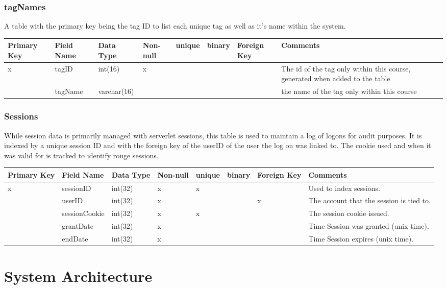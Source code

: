 \documentclass{article}
\begin{document}
\subsubsection{tagNames}
A table with the primary key being the tag ID to list each unique tag as well as it's name within the system.\\
\begin{tabular}{|m{1cm} | m{2cm} | m{1.5cm}| m{1cm} | m{1cm}| m{1cm} | m{1cm}| m{4cm}| }
  \hline
  Primary Key & Field Name & Data Type & Non-null & unique & binary & Foreign Key & Comments\\ 
  \hline
  x & tagID & int(16) & x & & & & The id of the tag only within this course, generated when added to the table\\
  \hline
   & tagName & varchar(16) & & & & & the name of the tag only within this course\\
  \hline
\end{tabular}

\subsubsection{Sessions}
While session data is primarily managed with serverlet sessions, this table is used to maintain a log of logons for audit purposes. It is indexed by a unique session ID and with the foreign key of the userID of the user the log on was linked to. The cookie used and when it was valid for is tracked to identify rouge sessions.\\
\begin{tabular}{|m{1cm} | m{2cm} | m{1.5cm}| m{1cm} | m{1cm}| m{1cm} | m{1cm}| m{4cm}| }
  \hline
  Primary Key & Field Name & Data Type & Non-null & unique & binary & Foreign Key & Comments\\ 
  \hline
  x & sessionID & int(32) & x & x & & & Used to index sessions.\\
  \hline
   & userID & int(32) & x & & & x & The account that the session is tied to.\\
  \hline
   & sessionCookie & int(32) & x & x & & & The session cookie issued.\\
  \hline
   & grantDate & int(32) & x &  & &  & Time Session was granted (unix time).\\
  \hline
   & endDate & int(32) & x &  & &  & Time Session expires (unix time).\\
  \hline
\end{tabular}

\section{System Architecture}
\end{document}
